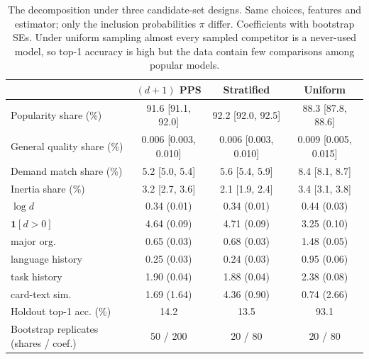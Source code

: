 \begin{table}[t]
\centering
\caption{The decomposition under three candidate-set designs. Same choices, features and estimator; only the inclusion probabilities $\pi$ differ. Coefficients with bootstrap SEs. Under uniform sampling almost every sampled competitor is a never-used model, so top-1 accuracy is high but the data contain few comparisons among popular models.}
\label{tab:q}
\small
\begin{tabular}{lccc}
\toprule
 & $(d{+}1)$ PPS & Stratified & Uniform \\
\midrule
Popularity share (\%) & 91.6 [91.1, 92.0] & 92.2 [92.0, 92.5] & 88.3 [87.8, 88.6] \\
General quality share (\%) & 0.006 [0.003, 0.010] & 0.006 [0.003, 0.010] & 0.009 [0.005, 0.015] \\
Demand match share (\%) & 5.2 [5.0, 5.4] & 5.6 [5.4, 5.9] & 8.4 [8.1, 8.7] \\
Inertia share (\%) & 3.2 [2.7, 3.6] & 2.1 [1.9, 2.4] & 3.4 [3.1, 3.8] \\
\midrule
$\log d$ & 0.34 (0.01) & 0.34 (0.01) & 0.44 (0.03) \\
$\mathbf{1}[d>0]$ & 4.64 (0.09) & 4.71 (0.09) & 3.25 (0.10) \\
major org. & 0.65 (0.03) & 0.68 (0.03) & 1.48 (0.05) \\
language history & 0.25 (0.03) & 0.24 (0.03) & 0.95 (0.06) \\
task history & 1.90 (0.04) & 1.88 (0.04) & 2.38 (0.08) \\
card-text sim. & 1.69 (1.64) & 4.36 (0.90) & 0.74 (2.66) \\
\midrule
Holdout top-1 acc. (\%) & 14.2 & 13.5 & 93.1 \\
Bootstrap replicates (shares / coef.) & 50 / 200 & 20 / 80 & 20 / 80 \\
\bottomrule
\end{tabular}
\end{table}
